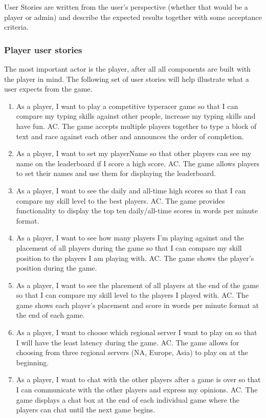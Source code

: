 \documentclass[titlepage]{article}
\begin{document}
User Stories are written from the user's perspective (whether that would be a player or admin) and describe the expected results together with some acceptance criteria.

\subsubsection{Player user stories}

The most important actor is the player, after all all components are built with the player in mind. The following set of user stories will help illustrate what a user expects from the game.

\newcommand{\AC}{\subitem AC. }

\begin{enumerate}
	\item
	      As a player, I want to play a competitive typeracer game so that I can compare my typing skills against other people, increase my typing skills and have fun.
	      \AC
	      The game accepts multiple players together to type a block of text and race against each other and announces the order of completion.

	\item
	      As a player, I want to set my playerName so that other players can see my name on the leaderboard if I score a high score.
	      \AC
	      The game allows players to set their names and use them for displaying the leaderboard.

	\item
	      As a player, I want to see the daily and all-time high scores so that I can compare my skill level to the best players.
	      \AC
	      The game provides functionality to display the top ten daily/all-time scores in words per minute format.

	\item
	      As a player, I want to see how many players I’m playing against and the placement of all players during the game so that I can compare my skill position to the players I am playing with.
	      \AC
	      The game shows the player’s position during the game.

	\item
	      As a player, I want to see the placement of all players at the end of the game so that I can compare my skill level to the players I played with.
	      \AC
	      The game shows each player’s placement and score in words per minute format at the end of each game.

	\item
	      As a player, I want to choose which regional server I want to play on so that I will have the least latency during the game.
	      \AC
	      The game allows for choosing from three regional servers (NA, Europe, Asia) to play on at the beginning.

	\item
	      As a player, I want to chat with the other players after a game is over so that I can communicate with the other players and express my opinions.
	      \AC
	      The game displays a chat box at the end of each individual game where the players can chat until the next game begins.
\end{enumerate}
\end{document}
